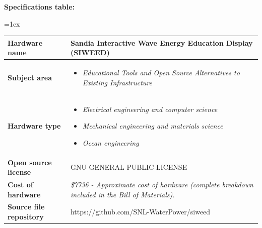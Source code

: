 \documentclass[11pt, letterpaper]{article}
\begin{document}
\begin{flushleft}
\textbf{Specifications table:}

\tabulinesep=1ex
\begin{tabu} to \linewidth {|X|X[3,l]|}
\hline  \textbf{Hardware name} & Sandia Interactive Wave Energy Education Display (SIWEED)
  \\
  \hline \textbf{Subject area} & %
  \begin{itemize}
  \item \textit{Educational Tools and Open Source Alternatives to Existing Infrastructure}
  \end{itemize}
  \\
  \hline \textbf{Hardware type} &
  \begin{itemize}
  \item \textit{Electrical engineering and computer science}
  \item \textit{Mechanical engineering and materials science}
  \item \textit{Ocean engineering}
  \end{itemize}
  \\ 
\hline \textbf{Open source license} &
  GNU GENERAL PUBLIC LICENSE
  \\
\hline \textbf{Cost of hardware} &
  \textit{\$7736 - Approximate cost of hardware (complete breakdown included in the Bill of Materials).}
  \\
\hline \textbf{Source file repository} & 
  https://github.com/SNL-WaterPower/siweed
\\\hline
\end{tabu}
 
\end{flushleft}
\end{document}
